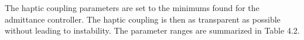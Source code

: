 \documentclass[12pt]{report}
\begin{document}

	
	The haptic coupling parameters are set to the minimums found for the admittance controller. The haptic coupling is then as transparent as possible without leading to instability. The parameter ranges are summarized in Table 4.2. 
	
		
\end{document}
